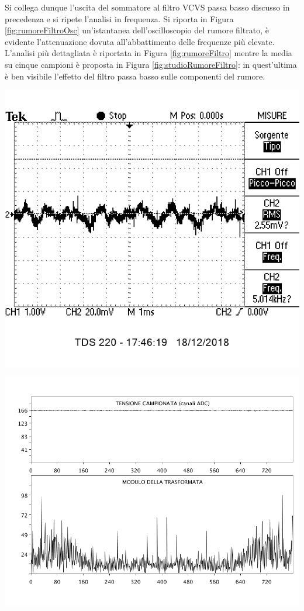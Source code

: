 \documentclass[10pt,oneside,a4paper]{article}
\newenvironment{Figure}
  {\par\medskip\noindent\minipage{\linewidth}}
  {\endminipage\par\medskip}
\begin{document}
\begin{multicols}{2}
Si collega dunque l'uscita del sommatore al filtro VCVS passa basso discusso in precedenza e si ripete l'analisi in frequenza. Si riporta in Figura \ref{fig:rumoreFiltroOsc} un'istantanea dell'oscilloscopio del rumore filtrato, è evidente l'attenuazione dovuta all'abbattimento delle frequenze più elevate. L'analisi più dettagliata è riportata in Figura \ref{fig:rumoreFiltro} mentre la media su cinque campioni è proposta in Figura \ref{fig:studioRumoreFiltro}: in quest'ultima è ben visibile l'effetto del filtro passa basso sulle componenti del rumore.
\begin{Figure}
	\begin{center}
	\includegraphics[width=0.8\linewidth]{rumoreFIltroOsc}
	\label{fig:rumoreFiltroOsc}
	\end{center}
\end{Figure}
\begin{Figure}
	\begin{center}
	\includegraphics[width=\linewidth]{rumoreFiltro}

\end{center}
\end{Figure}
\end{multicols}
\end{document}
